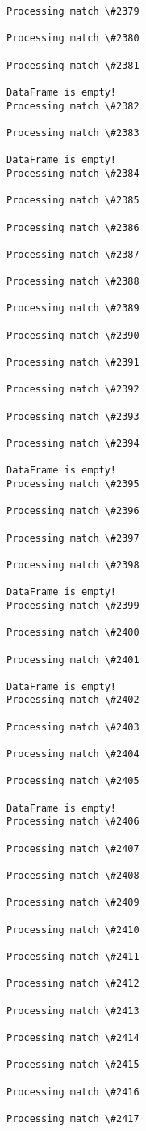 \documentclass[11pt]{article}
\begin{document}
\begin{Verbatim}[commandchars=\\\{\}]
Processing match \#2379

Processing match \#2380

Processing match \#2381

DataFrame is empty!
Processing match \#2382

Processing match \#2383

DataFrame is empty!
Processing match \#2384

Processing match \#2385

Processing match \#2386

Processing match \#2387

Processing match \#2388

Processing match \#2389

Processing match \#2390

Processing match \#2391

Processing match \#2392

Processing match \#2393

Processing match \#2394

DataFrame is empty!
Processing match \#2395

Processing match \#2396

Processing match \#2397

Processing match \#2398

DataFrame is empty!
Processing match \#2399

Processing match \#2400

Processing match \#2401

DataFrame is empty!
Processing match \#2402

Processing match \#2403

Processing match \#2404

Processing match \#2405

DataFrame is empty!
Processing match \#2406

Processing match \#2407

Processing match \#2408

Processing match \#2409

Processing match \#2410

Processing match \#2411

Processing match \#2412

Processing match \#2413

Processing match \#2414

Processing match \#2415

Processing match \#2416

Processing match \#2417


\end{Verbatim}
\end{document}
